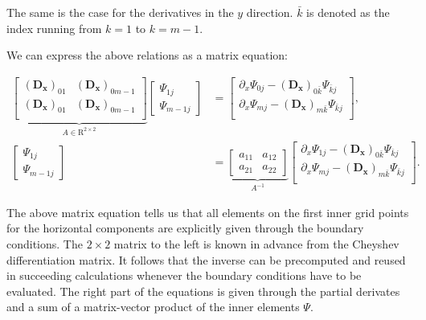 The same is the case for the derivatives in the $y$ direction. $\bar{k}$ is
denoted as the index running from $k=1$ to $k=m-1$.

We can express the above relations as a matrix equation:

\begin{align}
\underbrace{\begin{bmatrix} (\mathbf{D_x})_{01} & (\mathbf{D_x})_{0m-1} \\
    (\mathbf{D_x})_{01} & (\mathbf{D_x})_{0m-1} \\
\end{bmatrix}}_{A \in \mathrm{R}^{2 \times 2}}
\begin{bmatrix} \Psi_{1j} \\ \Psi_{m-1j}
\end{bmatrix} &=
\begin{bmatrix}
\partial_x\Psi_{0j} - (\mathbf{D_x})_{0\bar{k}}\Psi_{\bar{k}j} \\
\partial_x\Psi_{mj} - (\mathbf{D_x})_{m\bar{k}}\Psi_{\bar{k}j} \\
\end{bmatrix}, \nonumber \\
\begin{bmatrix} \Psi_{1j} \\ \Psi_{m-1j}
\end{bmatrix} &=
\underbrace{\begin{bmatrix} a_{11} & a_{12} \\ a_{21} & a_{22} 
\end{bmatrix}}_{A^{-1}}
\begin{bmatrix}
\partial_x\Psi_{1j} - (\mathbf{D_x})_{0\bar{k}}\Psi_{\bar{k}j} \\
\partial_x\Psi_{mj} - (\mathbf{D_x})_{m\bar{k}}\Psi_{\bar{k}j} \\
\end{bmatrix}.
\label{eq:mat1}
\end{align}

The above matrix equation tells us that all elements on the first inner grid
points for the horizontal components are explicitly given through the boundary
conditions. The $2 \times 2$ matrix to the left is known in advance from the
Cheyshev differentiation matrix. It follows that the inverse can be precomputed
and reused in succeeding calculations whenever the boundary conditions have to
be evaluated. The right part of the equations is given through the partial
derivates and a sum of a matrix-vector product of the inner elements $\Psi$.

